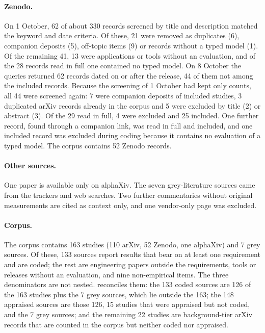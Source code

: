 \paragraph{Zenodo.} On 1 October, 62 of about 330 records screened by title and description matched the keyword and date criteria. Of these, 21 were removed as duplicates (6), companion deposits (5), off-topic items (9) or records without a typed model (1). Of the remaining 41, 13 were applications or tools without an evaluation, and of the 28 records read in full one contained no typed model. On 8 October the queries returned 62 records dated on or after the release, 44 of them not among the included records. Because the screening of 1 October had kept only counts, all 44 were screened again: 7 were companion deposits of included studies, 3 duplicated arXiv records already in the corpus and 5 were excluded by title (2) or abstract (3). Of the 29 read in full, 4 were excluded and 25 included. One further record, found through a companion link, was read in full and included, and one included record was excluded during coding because it contains no evaluation of a typed model. The corpus contains 52 Zenodo records.

\paragraph{Other sources.} One paper is available only on alphaXiv. The seven grey-literature sources came from the trackers and web searches. Two further commentaries without original measurements are cited as context only, and one vendor-only page was excluded.

\paragraph{Corpus.} The corpus contains 163 studies (110 arXiv, 52 Zenodo, one alphaXiv) and 7 grey sources. Of these, 133 sources report results that bear on at least one requirement and are coded; the rest are engineering papers outside the requirements, tools or releases without an evaluation, and nine non-empirical items. The three denominators are not nested.  reconciles them: the 133 coded sources are 126 of the 163 studies plus the 7 grey sources, which lie outside the 163; the 148 appraised sources are those 126, 15 studies that were appraised but not coded, and the 7 grey sources; and the remaining 22 studies are background-tier arXiv records that are counted in the corpus but neither coded nor appraised.

